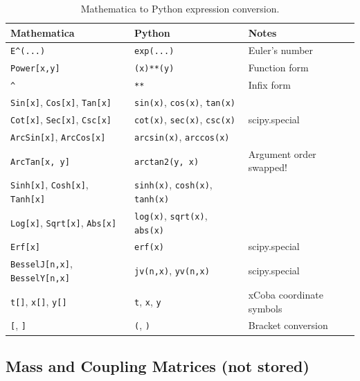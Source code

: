 \begin{table}[htbp]
\centering
\caption{Mathematica to Python expression conversion.}
\label{tab:json-mma-python}
\begin{tabular}{@{}lll@{}}
\toprule
Mathematica & Python & Notes \\
\midrule
\texttt{E\^{}(...)}                       & \texttt{exp(...)}                      & Euler's number \\
\texttt{Power[x,y]}                    & \texttt{(x)**(y)}                      & Function form \\
\texttt{\^{}}                             & \texttt{**}                            & Infix form \\
\texttt{Sin[x]}, \texttt{Cos[x]}, \texttt{Tan[x]}    & \texttt{sin(x)}, \texttt{cos(x)}, \texttt{tan(x)}    & \\
\texttt{Cot[x]}, \texttt{Sec[x]}, \texttt{Csc[x]}    & \texttt{cot(x)}, \texttt{sec(x)}, \texttt{csc(x)}    & scipy.special \\
\texttt{ArcSin[x]}, \texttt{ArcCos[x]}        & \texttt{arcsin(x)}, \texttt{arccos(x)}        & \\
\texttt{ArcTan[x, y]}                  & \texttt{arctan2(y, x)}                 & Argument order swapped! \\
\texttt{Sinh[x]}, \texttt{Cosh[x]}, \texttt{Tanh[x]} & \texttt{sinh(x)}, \texttt{cosh(x)}, \texttt{tanh(x)} & \\
\texttt{Log[x]}, \texttt{Sqrt[x]}, \texttt{Abs[x]}   & \texttt{log(x)}, \texttt{sqrt(x)}, \texttt{abs(x)}   & \\
\texttt{Erf[x]}                        & \texttt{erf(x)}                        & scipy.special \\
\texttt{BesselJ[n,x]}, \texttt{BesselY[n,x]}  & \texttt{jv(n,x)}, \texttt{yv(n,x)}            & scipy.special \\
\texttt{t[]}, \texttt{x[]}, \texttt{y[]}             & \texttt{t}, \texttt{x}, \texttt{y}                   & xCoba coordinate symbols \\
\texttt{[}, \texttt{]}                        & \texttt{(}, \texttt{)}                        & Bracket conversion \\
\bottomrule
\end{tabular}
\end{table}


\subsection{Mass and Coupling Matrices (not stored)}
\label{sec:json-coupling}

